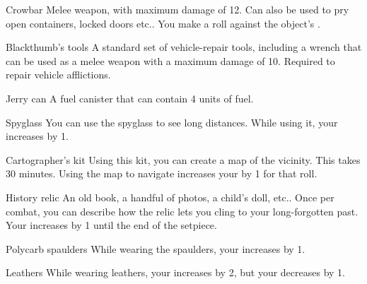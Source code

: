 \hr

\begin{describe}{Crowbar}
  Melee weapon, with maximum damage of 12. Can also be used to pry open containers, locked doors etc.. You make a  roll against the object's .
\end{describe}

\begin{describe}{Blackthumb's tools}
  A standard set of vehicle-repair tools, including a wrench that can be used as a melee weapon with a maximum damage of 10. Required to repair vehicle afflictions.
\end{describe}

\begin{describe}{Jerry can}
  A fuel canister that can contain 4 units of fuel.
\end{describe}

\begin{describe}{Spyglass}
  You can use the spyglass to see long distances. While using it, your  increases by 1.
\end{describe}

\begin{describe}{Cartographer's kit}
  Using this kit, you can create a map of the vicinity. This takes 30 minutes. Using the map to navigate increases your  by 1 for that roll.
\end{describe}

\begin{describe}{History relic}
  An old book, a handful of photos, a child's doll, etc.. Once per combat, you can describe how the relic lets you cling to your long-forgotten past. Your  increases by 1 until the end of the setpiece.
\end{describe}

\hr

\begin{describe}{Polycarb spaulders}
  While wearing the spaulders, your  increases by 1.
\end{describe}

\begin{describe}{Leathers}
  While wearing leathers, your  increases by 2, but your  decreases by 1.
\end{describe}
